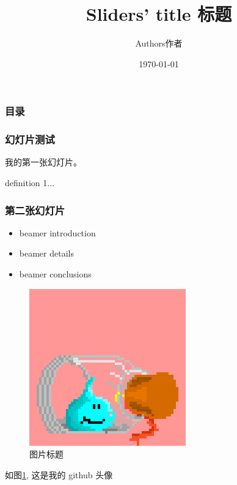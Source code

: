 \documentclass[UTF8]{beamer}
\title{Sliders' title 标题}
\author{Authors作者}
\date{\today}
\begin{document}


\begin{frame}
	\titlepage   
\end{frame}

\begin{frame} \frametitle{目录} %
	\tableofcontents
\end{frame}


\begin{frame} \frametitle{幻灯片测试} \pause
	我的第一张幻灯片。
	\begin{definition}
		definition 1...
	\end{definition}
\end{frame}

\begin{frame} \frametitle{第二张幻灯片} \pause
	\begin{itemize}
	\item beamer introduction \pause
	\item beamer details \pause
	\item beamer conclusions
	\end{itemize}
\end{frame}

\begin{frame}

\begin{figure}
	\centering
	\includegraphics[width=0.25\linewidth]{../latex/raw/raindrop-adventure.png}
	\caption{图片标题}
	\label{raindrop}
\end{figure}

如图\ref{raindrop}, 这是我的 github 头像

\end{frame}
\end{document}
